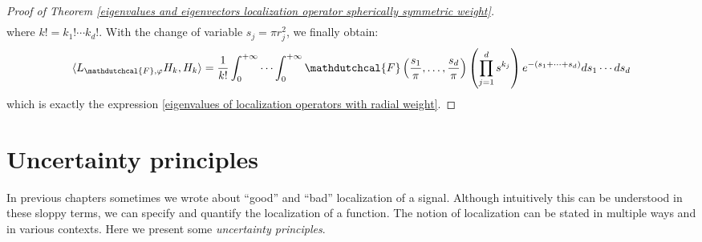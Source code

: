 \documentclass[corpo=11pt, stile=classica, tipotesi=custom,
greek, evenboxes, english]{toptesi}
\numberwithin{equation}{chapter}
\theoremstyle{remark}
\begin{document}
\begin{proof}[Proof of Theorem \ref{eigenvalues and eigenvectors localization operator spherically symmetric weight}]
\begin{align*}
	\end{align*}
	where $k! = k_1! \cdots k_d!$. With the change of variable $s_j = \pi r_j^2$, we finally obtain:
	\begin{equation*}
		\langle  L_{\mathdutchcal{F},\varphi}H_k,H_k\rangle = \dfrac{1}{k!} \int_0^{+\infty} \cdots \int_0^{+\infty} \mathdutchcal{F}\left(\frac{s_1}{\pi},\ldots,\frac{s_d}{\pi}\right) \left(\prod_{j=1}^{d} s^{k_j} \right) e^{-(s_1 + \cdots + s_d)} ds_1 \cdots ds_d
	\end{equation*}
	which is exactly the expression \eqref{eigenvalues of localization operators with radial weight}.
\end{proof}





\chapter{Uncertainty principles}\label{chapter uncertainty principles}
In previous chapters sometimes we wrote about ``good'' and ``bad'' localization of a signal. Although intuitively this can be understood in these sloppy terms, we can specify and quantify the localization of a function. The notion of localization can be stated in multiple ways and in various contexts. {\color{blue} Here we present some \emph{uncertainty principles}.}
\end{document}
